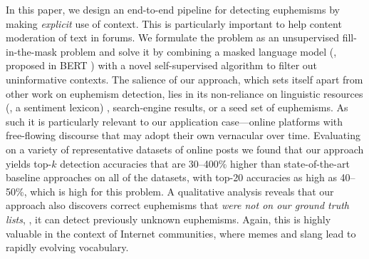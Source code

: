 In this paper, we design an end-to-end pipeline for detecting euphemisms by making \textit{explicit} use of context. 
This is particularly important to help content moderation of text in forums. 
We formulate the problem as an unsupervised fill-in-the-mask problem \cite{devlin2019bert,donahue2020enabling} and solve it by combining a masked language model (\eg, proposed in BERT \cite{devlin2019bert}) with a novel self-supervised algorithm to filter out uninformative contexts.
The salience of our approach, which sets itself apart from other work on euphemism detection, lies in its non-reliance on linguistic resources (\eg, a sentiment lexicon) \cite{felt2020recognizing}, search-engine results, or a seed set   of euphemisms. 
As such it is particularly relevant to our application case---online
platforms with free-flowing discourse that may adopt their own 
vernacular over time. 
Evaluating on a variety of representative datasets of online posts
we found that our approach yields  top-$k$ detection accuracies that are 30--400\% higher than state-of-the-art baseline approaches on all of the datasets, with top-20 accuracies as high as 40--50\%, which is high for this problem. 
A qualitative analysis reveals that our approach also discovers correct euphemisms that {\em were not on our ground truth lists}, \ie, it can 
detect previously unknown euphemisms. 
Again, this is highly valuable in the context of 
Internet communities, where memes 
and slang lead to rapidly evolving vocabulary.

